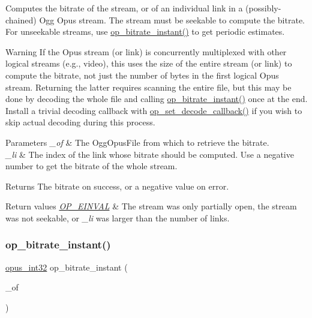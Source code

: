 Computes the bitrate of the stream, or of an individual link in a (possibly-\/chained) Ogg Opus stream. The stream must be seekable to compute the bitrate. For unseekable streams, use \mbox{\hyperlink{group__stream__info_ga7e9e871615055673d5e3c7b4c1dfce80}{op\+\_\+bitrate\+\_\+instant()}} to get periodic estimates. \begin{DoxyWarning}{Warning}
If the Opus stream (or link) is concurrently multiplexed with other logical streams (e.\+g., video), this uses the size of the entire stream (or link) to compute the bitrate, not just the number of bytes in the first logical Opus stream. Returning the latter requires scanning the entire file, but this may be done by decoding the whole file and calling \mbox{\hyperlink{group__stream__info_ga7e9e871615055673d5e3c7b4c1dfce80}{op\+\_\+bitrate\+\_\+instant()}} once at the end. Install a trivial decoding callback with \mbox{\hyperlink{group__stream__decoding_gae0d5b986dff23a82b6002915268ee3d1}{op\+\_\+set\+\_\+decode\+\_\+callback()}} if you wish to skip actual decoding during this process. 
\end{DoxyWarning}

\begin{DoxyParams}{Parameters}
{\em \+\_\+of} & The {\ttfamily Ogg\+Opus\+File} from which to retrieve the bitrate. \\
\hline
{\em \+\_\+li} & The index of the link whose bitrate should be computed. Use a negative number to get the bitrate of the whole stream. \\
\hline
\end{DoxyParams}
\begin{DoxyReturn}{Returns}
The bitrate on success, or a negative value on error. 
\end{DoxyReturn}

\begin{DoxyRetVals}{Return values}
{\em \mbox{\hyperlink{group__error__codes_gae0879acafe9cc0ab72462d291fdb6fb6}{O\+P\+\_\+\+E\+I\+N\+V\+AL}}} & The stream was only partially open, the stream was not seekable, or {\itshape \+\_\+li} was larger than the number of links. \\
\hline
\end{DoxyRetVals}
\mbox{\label{group__stream__info_ga7e9e871615055673d5e3c7b4c1dfce80}} 
\subsubsection{\texorpdfstring{op\_bitrate\_instant()}{op\_bitrate\_instant()}}
{\footnotesize\ttfamily \mbox{\hyperlink{opus__types_8h_aa4d309d6f80b99dbabebc8f98879ab9a}{opus\+\_\+int32}} op\+\_\+bitrate\+\_\+instant (\begin{DoxyParamCaption}\item[{Ogg\+Opus\+File $\ast$}]{\+\_\+of }\end{DoxyParamCaption})}

